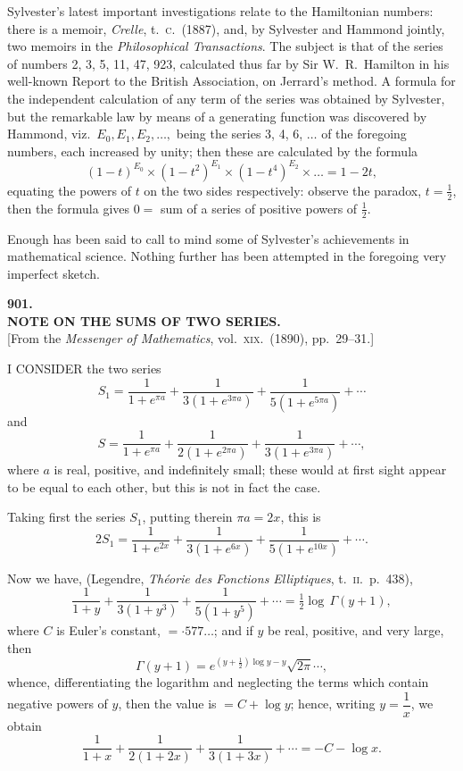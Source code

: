 \documentclass[11pt,a4paper]{article}
\begin{document}
Sylvester's latest important investigations relate to the Hamiltonian numbers: there is a memoir, \emph{Crelle}, t.\ \textsc{c}.\ (1887), and, by Sylvester and Hammond jointly, two memoirs in the \emph{Philosophical Transactions}. The subject is that of the series of numbers 2, 3, 5, 11, 47, 923, calculated thus far by Sir W.\ R.\ Hamilton in his well-known Report to the British Association, on Jerrard's method. A formula for the independent calculation of any term of the series was obtained by Sylvester, but the remarkable law by means of a generating function was discovered by Hammond, viz.\ $E_0, E_1, E_2, \ldots,$ being the series 3, 4, 6, $\ldots$ of the foregoing numbers, each increased by unity; then these are calculated by the formula
\[
(1 - t)^{E_0} \times (1 - t^2)^{E_1} \times (1 - t^4)^{E_2} \times \ldots = 1 - 2t,
\]
equating the powers of $t$ on the two sides respectively: observe the paradox, $t = \tfrac{1}{2}$, then the formula gives $0 = $ sum of a series of positive powers of $\tfrac{1}{2}$.

Enough has been said to call to mind some of Sylvester's achievements in mathematical science. Nothing further has been attempted in the foregoing very imperfect sketch.

\clearpage

\begin{center}
{\large\bfseries 901.}\\[0.5em]
{\large\bfseries NOTE ON THE SUMS OF TWO SERIES.}\\[0.5em]
\small [From the \emph{Messenger of Mathematics}, vol.\ \textsc{xix}.\ (1890), pp.\ 29--31.]
\end{center}
\medskip

\noindent I CONSIDER the two series
\[
S_1 = \frac{1}{1 + e^{\pi a}} + \frac{1}{3(1 + e^{3\pi a})} + \frac{1}{5(1 + e^{5\pi a})} + \cdots
\]
and
\[
S = \frac{1}{1 + e^{\pi a}} + \frac{1}{2(1 + e^{2\pi a})} + \frac{1}{3(1 + e^{3\pi a})} + \cdots,
\]
where $a$ is real, positive, and indefinitely small; these would at first sight appear to be equal to each other, but this is not in fact the case.

Taking first the series $S_1$, putting therein $\pi a = 2x$, this is
\[
2S_1 = \frac{1}{1 + e^{2x}} + \frac{1}{3(1 + e^{6x})} + \frac{1}{5(1 + e^{10x})} + \cdots.
\]

Now we have, (Legendre, \emph{Th\'eorie des Fonctions Elliptiques}, t.\ \textsc{ii}.\ p.\ 438),
\[
\frac{1}{1 + y} + \frac{1}{3(1 + y^3)} + \frac{1}{5(1 + y^5)} + \cdots = \tfrac{1}{2} \log\,\Gamma(y + 1),
\]
where $C$ is Euler's constant, $= \cdot 577\ldots$; and if $y$ be real, positive, and very large, then
\[
\Gamma(y + 1) = e^{(y + \frac{1}{2})\log y - y} \sqrt{2\pi} \cdots,
\]
whence, differentiating the logarithm and neglecting the terms which contain negative powers of $y$, then the value is $= C + \log y$; hence, writing $y = \dfrac{1}{x}$, we obtain
\[
\frac{1}{1 + x} + \frac{1}{2(1 + 2x)} + \frac{1}{3(1 + 3x)} + \cdots = -C - \log x.
\]
\end{document}
